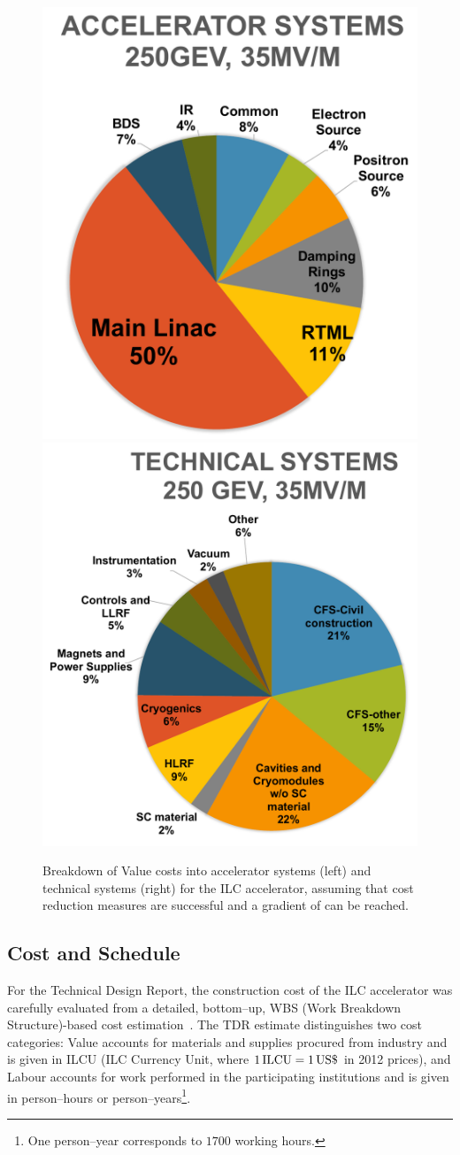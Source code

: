 \begin{figure}[htbp]
 \begin{center}
 \includegraphics[width=0.36\hsize]{chapters/figures/costs-as.pdf}
 \includegraphics[width=0.4\hsize]{chapters/figures/costs-ts.pdf}
\caption{Breakdown of Value costs into accelerator systems (left) and technical systems (right) for the  ILC accelerator, assuming that cost reduction measures are successful and a gradient of  can be reached.
\label{fig:costs}}
 \end{center}
 \end{figure}


\subsection{Cost and Schedule}


%

For the Technical Design Report, the construction cost of the ILC accelerator was carefully evaluated from a detailed, bottom--up, WBS (Work Breakdown Structure)-based cost estimation~\cite[Sect. 15]{Adolphsen:2013kya}.
The TDR estimate distinguishes two cost categories: Value accounts for materials and supplies procured from industry and is given in ILCU (ILC Currency Unit, where $1\,{\mathrm{ILCU}} = 1\,{\mathrm{US\$}}$ in 2012 prices), and Labour accounts for work performed in the participating institutions and is given in person--hours or person--years\footnote{One person--year corresponds to $1700$ working hours.}.

